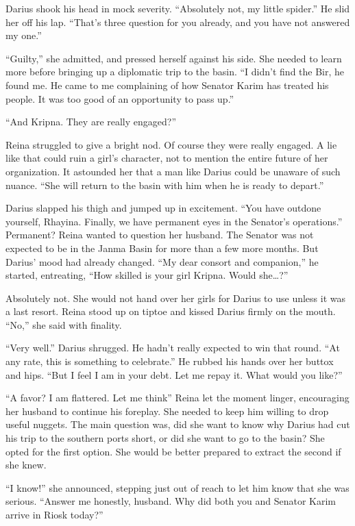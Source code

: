 \documentclass{article}
\begin{document}
	Darius shook his head in mock severity. “Absolutely not, my little spider.” He slid her off his lap. “That’s three question for you already, and you have not answered my one.”
	
	
	“Guilty,” she admitted, and pressed herself against his side. She needed to learn more before bringing up a diplomatic trip to the basin. “I didn’t find the Bir, he found me. He came to me complaining of how Senator Karim has treated his people. It was too good of an opportunity to pass up.”
	
	“And Kripna. They are really engaged?”
	
	Reina struggled to give a bright nod. Of course they were really engaged. A lie like that could ruin a girl’s character, not to mention the entire future of her organization. It astounded her that a man like Darius could be unaware of such nuance. “She will return to the basin with him when he is ready to depart.”
	
	Darius slapped his thigh and jumped up in excitement. “You have outdone yourself, Rhayina. Finally, we have permanent eyes in the Senator’s operations.” Permanent? Reina wanted to question her husband. The Senator was not expected to be in the Janma Basin for more than a few more months. But Darius’ mood had already changed. “My dear consort and companion,” he started, entreating, “How skilled is your girl Kripna. Would she…?”
	
	Absolutely not. She would not hand over her girls for Darius to use unless it was a last resort. Reina stood up on tiptoe and kissed Darius firmly on the mouth. “No,” she said with finality. 
	
	“Very well.” Darius shrugged. He hadn’t really expected to win that round. “At any rate, this is something to celebrate.” He rubbed his hands over her buttox and hips. “But I feel I am in your debt. Let me repay it. What would you like?”
	
	“A favor? I am flattered. Let me think” Reina let the moment linger, encouraging her husband to continue his foreplay. She needed to keep him willing to drop useful nuggets. The main question was, did she want to know why Darius had cut his trip to the southern ports short, or did she want to go to the basin? She opted for the first option. She would be better prepared to extract the second if she knew.
	
	“I know!” she announced, stepping just out of reach to let him know that she was serious. “Answer me honestly, husband. Why did both you and Senator Karim arrive in Riosk today?” 
	
\end{document}
